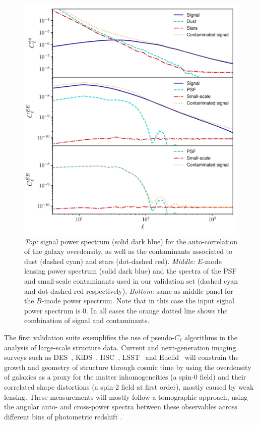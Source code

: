 \documentclass[usenatbib]{mnrasb}
\begin{document}
        \begin{figure}
          \centering
          \includegraphics[width=0.99\columnwidth]{cls_cont_lss}
          \caption{{\sl Top:} signal power spectrum (solid dark blue) for the auto-correlation of the galaxy overdensity, as well as the contaminants associated to dust (dashed cyan) and stars (dot-dashed red). {\sl Middle:} $E$-mode lensing power spectrum (solid dark blue) and the spectra of the PSF and small-scale contaminants used in our validation set (dashed cyan and dot-dashed red respectively). {\sl Bottom:} same as middle panel for the $B$-mode power spectrum. Note that in this case the input signal power spectrum is $0$. In all cases the orange dotted line shows the combination of signal and contaminants.} \label{fig:lss_cont_cls}
        \end{figure}
        The first validation suite exemplifies the use of pseudo-$C_\ell$ algorithms in the analysis of large-scale structure data. Current and next-generation imaging surveys such as DES~\citep{2016MNRAS.460.1270D},
        KiDS~\citep{2017A&A...604A.134D}, HSC~\citep{2018PASJ...70S...4A}, LSST~\citep{2008arXiv0805.2366I} and Euclid~\citep{2011arXiv1110.3193L} will constrain the growth and geometry of structure through cosmic time by using the overdensity of galaxies as a proxy for the matter inhomogeneities (a spin-0 field) and their correlated shape distortions (a spin-2 field at first order), mostly caused by weak lensing. These measurements will mostly follow a tomographic approach, using the angular auto- and cross-power spectra between these observables across different bins of photometric redshift \citep{2017arXiv170609359K,2018MNRAS.474.4894J,2017arXiv170801530D}.
        
\end{document}
